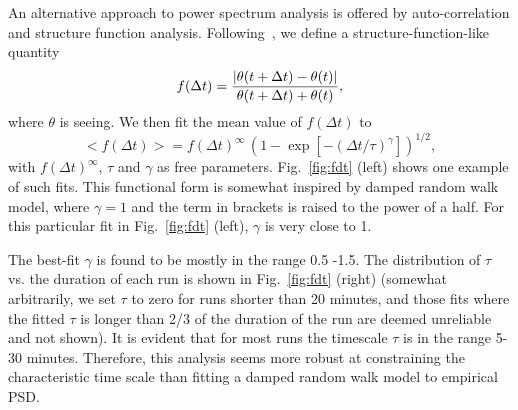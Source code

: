 An alternative approach to power spectrum analysis is offered by auto-correlation 
and structure function analysis. Following~\cite{Racine1996}, we define a 
structure-function-like quantity
\begin{equation}
       f(\Delta t) = {| \theta(t+\Delta t) - \theta(t)| \over  \theta(t+\Delta t) + \theta(t) },
\end{equation} 
where $\theta$ is seeing. We then fit the mean value of $f(\Delta t)$ to 
\begin{equation}
    < f(\Delta t) > =  f(\Delta t) ^\infty \, \left( 1 - \exp[-(\Delta
      t/\tau)^\gamma] \right)^{1/2},
\label{eq:fdt}
\end{equation} 
with $f(\Delta t) ^\infty$, $\tau$ and $\gamma$ as free parameters.
Fig.~\ref{fig:fdt} (left) shows one example of such fits. This functional form is 
somewhat inspired by damped random walk model, where $\gamma=1$ and the 
term in brackets is raised to the power of a half. 
For this particular fit in Fig.~\ref{fig:fdt} (left), $\gamma$ is very close to 1.

The best-fit $\gamma$ is found to be mostly in the range 0.5 -1.5. 
The distribution of $\tau$ vs. 
the duration of each run is shown in Fig.~\ref{fig:fdt} (right) (somewhat 
arbitrarily, we set $\tau$ to zero for runs shorter than 20 minutes,
and those fits where the fitted $\tau$ is longer than 2/3 of the duration
of the run are deemed unreliable and not shown).  
It is evident that 
for most runs the timescale $\tau$ is in the range 5-30 minutes.
Therefore, this analysis seems more robust at constraining the characteristic time
scale than fitting a damped random walk model to empirical PSD. 
